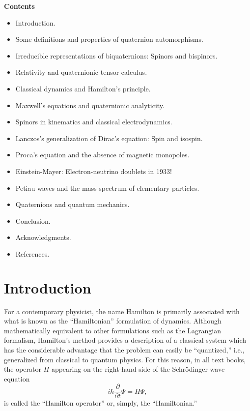 \documentclass [12pt,a4paper      ]{article}
\begin{document}
                          \begin{center}
                          {\bf Contents}
                          \end{center}
\begin{itemize}
\item[\ref{int:0}.] Introduction.
\item[\ref{def:0}.] Some definitions and properties of quaternion automorphisms.
\item[\ref{irr:0}.] Irreducible representations of biquaternions: Spinors and bispinors.
\item[\ref{rel:0}.] Relativity and quaternionic tensor calculus.
\item[\ref{cla:0}.] Classical dynamics and Hamilton's principle.
\item[\ref{max:0}.] Maxwell's equations and quaternionic analyticity.
\item[\ref{spi:0}.] Spinors in kinematics and classical electrodynamics.
\item[\ref{lan:0}.] Lanczos's generalization of Dirac's equation: Spin and isospin.
\item[\ref{pro:0}.] Proca's equation and the absence of magnetic monopoles. 
\item[\ref{ein:0}.] Einstein-Mayer: Electron-neutrino doublets in 1933!
\item[\ref{pet:0}.] Petiau waves and the mass spectrum of elementary particles.
\item[\ref{qua:0}.] Quaternions and quantum mechanics.
\item[\ref{con:0}.] Conclusion.
\item[\ref{ack:0}.] Acknowledgments.
\item[\ref{bib:0}.] References.
\end{itemize}
%
\section{Introduction}
\label{int:0}

     For a contemporary physicist, the name Hamilton is primarily 
associated with what is known as the ``Hamiltonian'' formulation of 
dynamics.     Although   mathematically   equivalent   to   other 
formulations such as the Lagrangian formalism,  Hamilton's method 
provides  a  description  of  a classical system  which  has  the 
considerable advantage that the problem can easily be ``quantized,'' 
i.e.,  generalized  from classical to quantum physics.   For this 
reason, in all text books, the operator $H$ appearing on the 
right-hand side of the Schr\"odinger wave equation 
%
\begin{equation}\label{E1}
  i\hbar \frac{\partial}{\partial t} \Psi  =  H  \Psi,    %
\end{equation}
%
is called the ``Hamilton operator'' or, simply, the ``Hamiltonian.''
\end{document}
